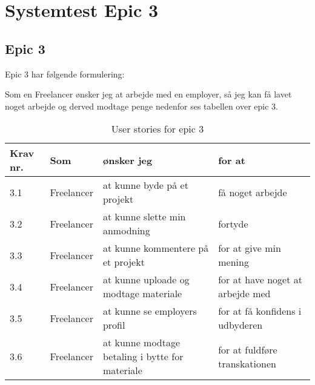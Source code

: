 \chapter{Systemtest Epic 3}
\section{Epic 3}
Epic 3 har følgende formulering:

Som en Freelancer ønsker jeg at arbejde med en employer, så jeg kan få lavet noget arbejde og derved modtage penge
nedenfor ses tabellen over epic 3.

\begin{table}[H]
    \centering
    \caption{User stories for epic 3}
    \label{tab:us-epic3}
    \begin{tabular}{p{1cm}|p{2cm}|p{6cm}|p{6cm}}
        \textbf{Krav nr.} & \textbf{Som} & \textbf{ønsker jeg}                             & \textbf{for at}                  \\
        \hline
        3.1               & Freelancer   & at kunne byde på et projekt                     & få noget arbejde                 \\
        \hline
        3.2               & Freelancer   & at kunne slette min anmodning                   & fortyde                          \\
        \hline
        3.3               & Freelancer   & at kunne kommentere på et projekt               & for at give min mening           \\
        \hline
        3.4               & Freelancer   & at kunne uploade og modtage materiale           & for at have noget at arbejde med \\
        \hline
        3.5               & Freelancer   & at kunne se employers profil                    & for at få konfidens i udbyderen  \\
        \hline
        3.6               & Freelancer   & at kunne modtage betaling i bytte for materiale & for at fuldføre transkationen    \\
    \end{tabular}
\end{table}



